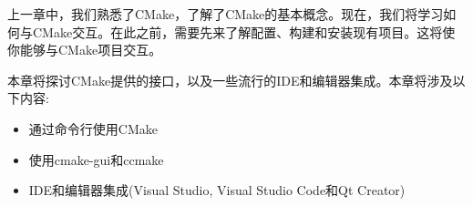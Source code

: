 上一章中，我们熟悉了CMake，了解了CMake的基本概念。现在，我们将学习如何与CMake交互。在此之前，需要先来了解配置、构建和安装现有项目。这将使你能够与CMake项目交互。

本章将探讨CMake提供的接口，以及一些流行的IDE和编辑器集成。本章将涉及以下内容:

\begin{itemize}
\item 
通过命令行使用CMake

\item 
使用cmake-gui和ccmake

\item 
IDE和编辑器集成(Visual Studio, Visual Studio Code和Qt Creator)
\end{itemize}